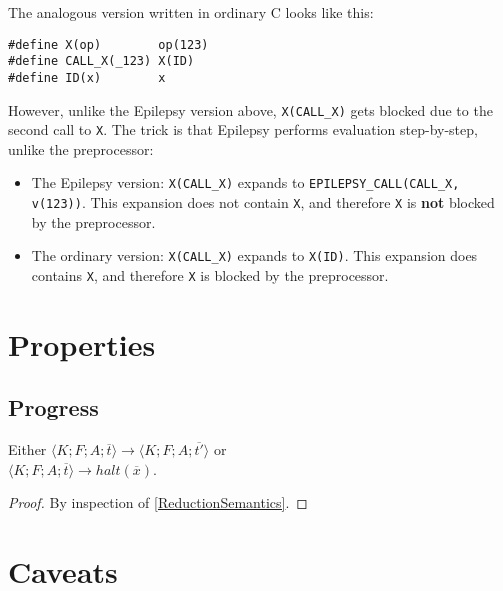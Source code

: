 \documentclass[12pt]{article}
\theoremstyle{break}
\begin{document}
The analogous version written in ordinary C looks like this:

\begin{verbatim}
#define X(op)        op(123)
#define CALL_X(_123) X(ID)
#define ID(x)        x
\end{verbatim}

However, unlike the Epilepsy version above, \texttt{X(CALL\_X)} gets blocked \cite{Blueprinting} due to the
second call to \texttt{X}. The trick is that Epilepsy performs evaluation step-by-step,
unlike the preprocessor:

\begin{itemize}
    \item The Epilepsy version: \texttt{X(CALL\_X)} expands to \texttt{EPILEPSY\_CALL(CALL\_X, v(123))}.
    This expansion does not contain \texttt{X}, and therefore \texttt{X} is \textbf{not}
    blocked by the preprocessor.

    \item The ordinary version: \texttt{X(CALL\_X)} expands to \texttt{X(ID)}. This expansion
    does contains \texttt{X}, and therefore \texttt{X} is blocked by the preprocessor.
\end{itemize}

\section{Properties}

\subsection{Progress}

\begin{proposition}[Progress]
Either $\langle K; F; A; \overline{t} \rangle \to \langle K; F; A; \overline{t'} \rangle$ or \\
$\langle K; F; A; \overline{t} \rangle \to halt(\overline{x})$.
\end{proposition}

\begin{proof}
By inspection of \ref{ReductionSemantics}.
\end{proof}

\section{Caveats}
\end{document}
